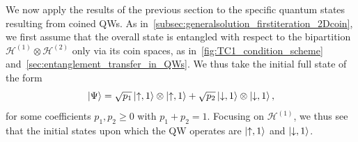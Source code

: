\documentclass[
	aps, pra,
	superscriptaddress, twocolumn,
	floatfix,
	10pt
]{revtex4-1}
\newcommand{\on}[1]{\operatorname{#1}}
\newcommand{\parTitle}[1]{\noindent{\color{Mahogany}(\emph{#1})}}
\newcommand{\calH}{{\mathcal{H}}}
\renewcommand{\parTitle}[1]{}
\begin{document}
\parTitle{Section outline}
We now apply the results of the previous section to the specific quantum states resulting from coined QWs.
As in~\cref{subsec:generalsolution_firstiteration_2Dcoin}, we first %
assume that the overall state is entangled with respect to the bipartition $\calH^{(1)}\otimes\calH^{(2)}$ only via its coin spaces, as in~\cref{fig:TC1_condition_scheme} and~\cref{sec:entanglement_transfer_in_QWs}. We thus take the initial full state of the form
\begin{equation}
\ket{\Psi}=    \sqrt{p_1} \ket{\uparrow,1}\otimes\ket{\uparrow,1} +
    \sqrt{p_2} \ket{\downarrow,1}\otimes\ket{\downarrow,1},
\end{equation}
for some coefficients $p_1,p_2\ge0$ with $p_1+p_2=1$.
Focusing on $\calH^{(1)}$, we thus see that the initial states upon which the QW operates are $\ket{\uparrow,1}$ and $\ket{\downarrow,1}$.
\end{document}
